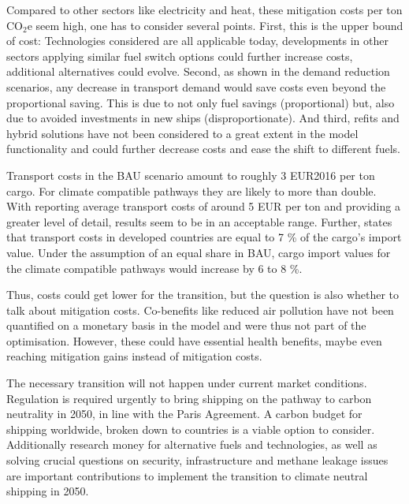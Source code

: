 \documentclass[article]{elsarticle}
\begin{document}
Compared to other sectors like electricity and heat, these mitigation costs per ton CO$_2$e seem high, one has to consider several points. First, this is the upper bound of cost: Technologies considered are all applicable today, developments in other sectors applying similar fuel switch options could further increase costs, additional alternatives could evolve. Second, as shown in the demand reduction scenarios, any decrease in transport demand would save costs even beyond the proportional saving. This is due to not only fuel savings (proportional) but, also due to avoided investments in new ships (disproportionate). And third, refits and hybrid solutions have not been considered to a great extent in the model functionality and could further decrease costs and ease the shift to different fuels.


Transport costs in the BAU scenario amount to roughly 3 EUR2016 per ton cargo. For climate compatible pathways they are likely to more than double. With \cite[p.~50]{UNCTAD2015} reporting average transport costs of around 5 EUR per ton and providing a greater level of detail, results seem to be in an acceptable range. Further, \cite[p.~55]{UNCTAD2015} states that transport costs in developed countries are equal to 7 \% of the cargo's import value. Under the assumption of an equal share in BAU, cargo import values for the climate compatible pathways would increase by 6 to 8 \%.



Thus, costs could get lower for the transition, but the question is also whether to talk about mitigation costs. Co-benefits like reduced air pollution have not been quantified on a monetary basis in the model and were thus not part of the optimisation. However, these could have essential health benefits, maybe even reaching mitigation gains instead of mitigation costs.

The necessary transition will not happen under current market conditions. Regulation is required urgently to bring shipping on the pathway to carbon neutrality in 2050, in line with the Paris Agreement. A carbon budget for shipping worldwide, broken down to countries is a viable option to consider. Additionally research money for alternative fuels and technologies, as well as solving crucial questions on security, infrastructure and methane leakage issues are important contributions to implement the transition to climate neutral shipping in 2050. 
\end{document}
